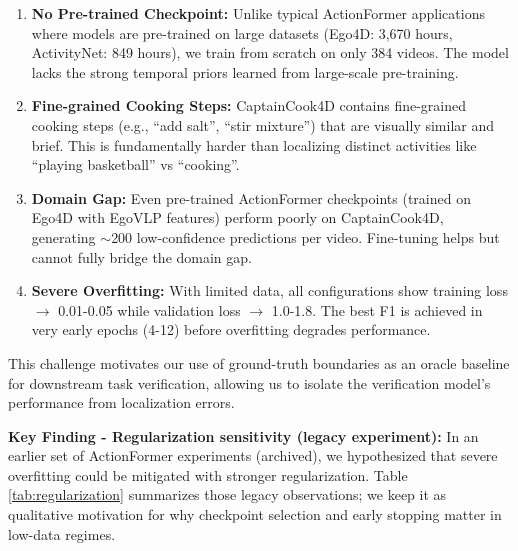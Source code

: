 \documentclass[10pt,twocolumn,letterpaper]{article}
\begin{document}
\begin{enumerate}
    \item \textbf{No Pre-trained Checkpoint:} Unlike typical ActionFormer applications where models are pre-trained on large datasets (Ego4D: 3,670 hours, ActivityNet: 849 hours), we train from scratch on only 384 videos. The model lacks the strong temporal priors learned from large-scale pre-training.
    
    \item \textbf{Fine-grained Cooking Steps:} CaptainCook4D contains fine-grained cooking steps (e.g., ``add salt'', ``stir mixture'') that are visually similar and brief. This is fundamentally harder than localizing distinct activities like ``playing basketball'' vs ``cooking''.
    
    \item \textbf{Domain Gap:} Even pre-trained ActionFormer checkpoints (trained on Ego4D with EgoVLP features) perform poorly on CaptainCook4D, generating $\sim$200 low-confidence predictions per video. Fine-tuning helps but cannot fully bridge the domain gap.
    
    \item \textbf{Severe Overfitting:} With limited data, all configurations show training loss $\rightarrow$ 0.01-0.05 while validation loss $\rightarrow$ 1.0-1.8. The best F1 is achieved in very early epochs (4-12) before overfitting degrades performance.
\end{enumerate}

This challenge motivates our use of ground-truth boundaries as an oracle baseline for downstream task verification, allowing us to isolate the verification model's performance from localization errors.

\textbf{Key Finding - Regularization sensitivity (legacy experiment):} In an earlier set of ActionFormer experiments (archived), we hypothesized that severe overfitting could be mitigated with stronger regularization. Table \ref{tab:regularization} summarizes those legacy observations; we keep it as qualitative motivation for why checkpoint selection and early stopping matter in low-data regimes.
\end{document}
